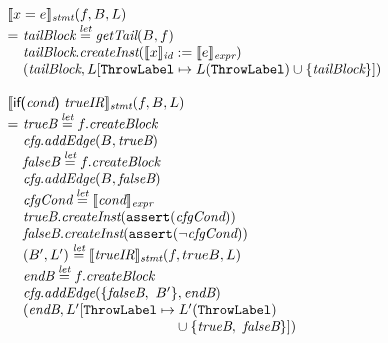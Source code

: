 \[
\begin{array}{l@{}l@{~}l}
\lefteqn{\transfun{\ircfgexpr{x}{e}}_{\emph{stmt}}(f, B, L)}\\
& = & \emph{tailBlock} \letval \getTail(B, f)\\
& & \emph{tailBlock}.\emph{createInst}(\transfun{x}_{\emph{id}} := \transfun{e}_{\emph{expr}})\\
& & (\emph{tailBlock}, L[\ThrowLabel \mapsto L(\ThrowLabel) \cup \{ \emph{tailBlock} \}])\\
& & \\

\lefteqn{\transfun{\ircfgif{\emph{cond}}{\emph{trueIR}}}_{\emph{stmt}}(f, B, L)}\\
& = & \emph{trueB} \letval f.\emph{createBlock}\\
& & \emph{cfg}.\emph{addEdge}(B, \emph{trueB})\\
& & \emph{falseB} \letval f.\emph{createBlock}\\
& & \emph{cfg}.\emph{addEdge}(B, \emph{falseB})\\
& & \emph{cfgCond} \letval \transfun{\emph{cond}}_{\emph{expr}}\\
& & \emph{trueB}.\emph{createInst}(\TT{assert}(\emph{cfgCond}))\\
& & \emph{falseB}.\emph{createInst}(\TT{assert}(\neg \emph{cfgCond}))\\
& & (B', L') \letval \transfun{\emph{trueIR}}_{\emph{stmt}}(f, trueB, L)\\
& & \emph{endB} \letval f.\emph{createBlock}\\
& & \emph{cfg}.\emph{addEdge}(\{ \emph{falseB},\ B' \}, \emph{endB})\\
& & (\emph{endB}, L'[\ThrowLabel \mapsto L'(\ThrowLabel)\\
& & \phantom{(\emph{endB}, L'[\ThrowLabel \mapsto}
 \cup \{ \emph{trueB},\ \emph{falseB} \}])\\


\end{array}\]
